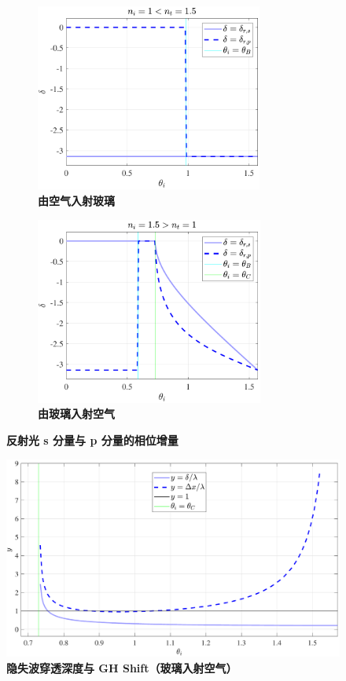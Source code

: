 \documentclass[UTF8]{report}
\theoremstyle{MyLineTheoremStyle} %
\theoremstyle{MyBlockTheoremStyle} %
\theoremstyle{MySubsubsectionStyle} %
\begin{document}
\begin{figure}[H]\centering
\begin{subfigure}[t]{0.5\columnwidth}\centering
    \includegraphics[height=175pt]{assets/1,2/光疏到光密.pdf}
    \caption{\bfseries 由空气入射玻璃 }
\end{subfigure}\begin{subfigure}[t]{0.5\columnwidth}\centering
    \includegraphics[height=175pt]{assets/1,2/光密到光疏.pdf}
    \caption{\bfseries 由玻璃入射空气 }
\end{subfigure}
\caption{\bfseries 反射光 s 分量与 p 分量的相位增量 }
\label{反射光 s 分量与 p 分量的相位增量}
\end{figure}

\begin{figure}[H]\centering
\includegraphics[width=0.70\columnwidth]{assets/1,2/2024-09-21_13-29-49.pdf}
\caption{\bfseries 隐失波穿透深度与 GH Shift（玻璃入射空气）}\label{隐失波穿透深度与 GH Shift 玻璃入射空气}
\end{figure}
\end{document}
